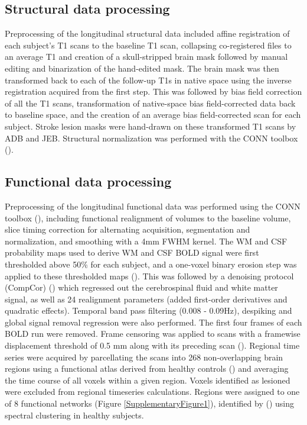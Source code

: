 \documentclass[phd,tocprelim]{cornell}
\begin{document}
	\subsection{Structural data processing}
	Preprocessing of the longitudinal structural data included affine registration of each subject’s T1 scans to the baseline T1 scan, collapsing co-registered files to an average T1 and creation of a skull-stripped brain mask followed by manual editing and binarization of the hand-edited mask. The brain mask was then transformed back to each of the follow-up T1s in native space using the inverse registration acquired from the first step. This was followed by bias field correction of all the T1 scans, transformation of native-space bias field-corrected data back to baseline space, and the creation of an average bias field-corrected scan for each subject. Stroke lesion masks were hand-drawn on these transformed T1 scans by ADB and JEB. Structural normalization was performed with the CONN toolbox (\cite{Whitfield-Gabrieli2012-ox}). 
	
	\subsection{Functional data processing}
	Preprocessing of the longitudinal functional data was performed using the CONN toolbox (\cite{Whitfield-Gabrieli2012-ox}), including functional realignment of volumes to the baseline volume, slice timing correction for alternating acquisition, segmentation and normalization, and smoothing with a 4mm FWHM kernel. The WM and CSF probability maps used to derive WM and CSF BOLD signal were first thresholded above 50\% for each subject, and a one-voxel binary erosion step was applied to these thresholded maps (\cite{Whitfield-Gabrieli2012-ox}). This was followed by a denoising protocol (CompCor) (\cite{Behzadi2007-zt}) which regressed out the cerebrospinal fluid and white matter signal, as well as 24 realignment parameters (added first-order derivatives and quadratic effects). Temporal band pass filtering (0.008 - 0.09Hz), despiking and global signal removal regression were also performed. The first four frames of each BOLD run were removed. Frame censoring was applied to scans with a framewise displacement threshold of 0.5 mm along with its preceding scan (\cite{Power2012-tq}). Regional time series were acquired by parcellating the scans into 268 non-overlapping brain regions using a functional atlas derived from healthy controls (\cite{Shen2013-zn}) and averaging the time course of all voxels within a given region. Voxels identified as lesioned were excluded from regional timeseries calculations. Regions were assigned to one of 8 functional networks (Figure \ref{SupplementaryFigure1}), identified by (\cite{Finn2015-er}) using spectral clustering in healthy subjects.
	
\end{document}
